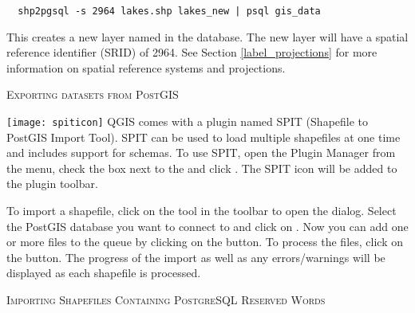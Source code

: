 \begin{verbatim} 
  shp2pgsql -s 2964 lakes.shp lakes_new | psql gis_data
\end{verbatim}

This creates a new layer named  in the
 database. The
new layer will have a spatial reference identifier (SRID) of 2964. See Section 
\ref{label_projections} for more information on spatial reference systems and
projections.
\begin{Tip}
\caption{\textsc{Exporting datasets from PostGIS}}
\end{Tip}

\texttt{[image: spiticon]} QGIS comes with a
plugin named 
SPIT (Shapefile to PostGIS Import Tool).
SPIT can be used to load multiple shapefiles at one time and includes support
for schemas. To use SPIT, open the Plugin Manager from the 
menu, check the box next to the  and click . The SPIT
icon will be added to the plugin toolbar. 

To import a shapefile, click on the  tool in the 
toolbar to open the 
 dialog. Select the PostGIS database 
you want to connect to and click on . Now you can add one or more 
files to the queue by clicking on the  button. To process the files, 
click on the  button. The progress of the import as well as any 
errors/warnings will be displayed as each shapefile is processed.

\begin{Tip}\caption{\textsc{Importing Shapefiles Containing
PostgreSQL Reserved Words}}
\end{Tip} 


